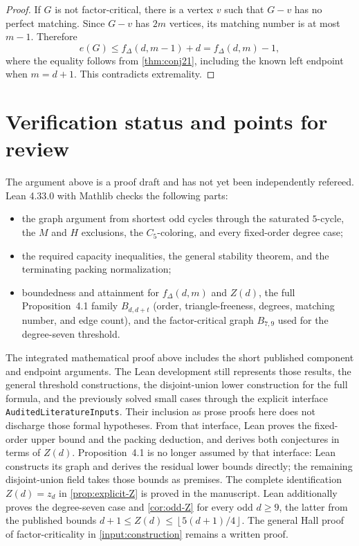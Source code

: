 \documentclass[11pt]{article}
\theoremstyle{definition}
\theoremstyle{remark}
\newcommand{\fDelta}{f_{\Delta}}
\newcommand{\floor}[1]{\left\lfloor #1\right\rfloor}
\begin{document}
\begin{proof}
If $G$ is not factor-critical, there is a vertex $v$ such that $G-v$ has no
perfect matching. Since $G-v$ has $2m$ vertices, its matching number is at most
$m-1$. Therefore
\[
  e(G)\le\fDelta(d,m-1)+d=\fDelta(d,m)-1,
\]
where the equality follows from \cref{thm:conj21}, including the known
left endpoint when $m=d+1$. This contradicts extremality.
\end{proof}

\section{Verification status and points for review}\label{sec:verification}

The argument above is a proof draft and has not yet been independently
refereed. Lean 4.33.0 with Mathlib checks the following parts:

\begin{itemize}
  \item the graph argument from shortest odd cycles through the saturated
  $5$-cycle, the $M$ and $H$ exclusions, the $C_5$-coloring, and every
  fixed-order degree case;
  \item the required capacity inequalities, the general stability theorem,
  and the terminating packing normalization;
  \item boundedness and attainment for $\fDelta(d,m)$ and $Z(d)$, the full
  Proposition~4.1 family $B_{d,d+t}$ (order, triangle-freeness, degrees,
  matching number, and edge count), and the factor-critical graph $B_{7,9}$
  used for the degree-seven threshold.
\end{itemize}

The integrated mathematical proof above includes the short published
component and endpoint arguments. The Lean development still represents
those results, the general threshold constructions, the disjoint-union lower
construction for the full formula, and the previously
solved small cases through the explicit interface
\texttt{AuditedLiteratureInputs}. Their inclusion as prose proofs here does
not discharge those formal hypotheses. From that interface, Lean proves the
fixed-order upper bound and the packing deduction, and derives both
conjectures in terms of $Z(d)$. Proposition~4.1 is no longer assumed by that
interface: Lean constructs its graph and derives the residual lower bounds
directly; the remaining disjoint-union field takes those bounds as premises.
The complete identification $Z(d)=z_d$ in
\cref{prop:explicit-Z} is proved in the manuscript. Lean additionally proves
the degree-seven case and \cref{cor:odd-Z} for every odd $d\ge9$, the latter
from the published bounds $d+1\le Z(d)\le\floor{5(d+1)/4}$. The general Hall proof of factor-criticality in
\cref{input:construction} remains a written proof.
\end{document}
